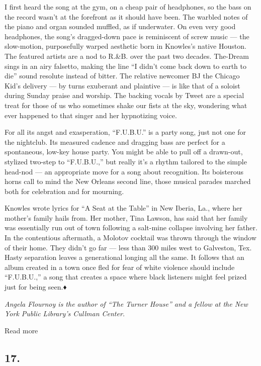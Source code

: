 I first heard the song at the gym, on a cheap pair of headphones, so the
bass on the record wasn't at the forefront as it should have been. The
warbled notes of the piano and organ sounded muffled, as if underwater.
On even very good headphones, the song's dragged-down pace is
reminiscent of screw music --- the slow-motion, purposefully warped
aesthetic born in Knowles's native Houston. The featured artists are a
nod to R.\&B. over the past two decades. The-Dream sings in an airy
falsetto, making the line ``I didn't come back down to earth to die''
sound resolute instead of bitter. The relative newcomer BJ the Chicago
Kid's delivery --- by turns exuberant and plaintive --- is like that of
a soloist during Sunday praise and worship. The backing vocals by Tweet
are a special treat for those of us who sometimes shake our fists at the
sky, wondering what ever happened to that singer and her hypnotizing
voice.

For all its angst and exasperation, ``F.U.B.U.'' is a party song, just
not one for the nightclub. Its measured cadence and dragging bass are
perfect for a spontaneous, low-key house party. You might be able to
pull off a drawn-out, stylized two-step to ``F.U.B.U.,'' but really it's
a rhythm tailored to the simple head-nod --- an appropriate move for a
song about recognition. Its boisterous horns call to mind the New
Orleans second line, those musical parades marched both for celebration
and for mourning.

Knowles wrote lyrics for ``A Seat at the Table'' in New Iberia, La.,
where her mother's family hails from. Her mother, Tina Lawson, has said
that her family was essentially run out of town following a salt-mine
collapse involving her father. In the contentious aftermath, a Molotov
cocktail was thrown through the window of their home. They didn't go far
--- less than 300 miles west to Galveston, Tex. Hasty separation leaves
a generational longing all the same. It follows that an album created in
a town once fled for fear of white violence should include ``F.U.B.U.,''
a song that creates a space where black listeners might feel prized just
for being seen.♦

\emph{Angela Flournoy is the author of ``The Turner House'' and a fellow
at the New York Public Library's Cullman Center.}

Read more

\hypertarget{17}{%
\subsection{17.}\label{17}}

